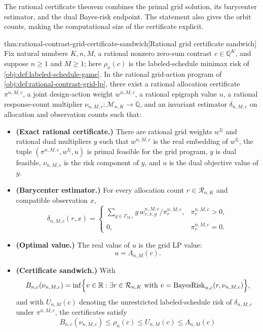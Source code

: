 \documentclass[11pt]{article}
\begin{document}
The rational certificate theorem combines the primal grid solution, its barycenter estimator, and the dual Bayes-risk endpoint. The statement also gives the orbit counts, making the computational size of the certificate explicit.

\begin{theoremv}{thm:rational-contrast-grid-certificate-sandwich}[Rational grid certificate sandwich]
Fix natural numbers \(K,n,M\), a rational nonzero zero-sum contrast \(c\in\mathbb Q^K\), and suppose \(n\geq 1\) and \(M\geq 1\); here \(\rho_n(c)\) is the labeled-schedule minimax risk of \cref{obj:def:labeled-schedule-game}.  In the rational grid-action program of \cref{obj:def:rational-contrast-grid-lp}, there exist a rational allocation certificate \(\pi^{n,M,c}\), a joint design-action weight \(w^{n,M,c}\), a rational epigraph value \(u\), a rational response-count multiplier \(\nu_{n,M,c}:\mathcal M_{n,K}\to\mathbb Q\), and an invariant estimator \(\delta_{n,M,c}\) on allocation and observation counts such that:
\begin{itemize}
\item \textbf{(Exact rational certificate.)}  There are rational grid weights \(w^{\mathbb Q}\) and rational dual multipliers \(y\) such that \(w^{n,M,c}\) is the real embedding of \(w^{\mathbb Q}\), the tuple \((\pi^{n,M,c},w^{\mathbb Q},u)\) is primal feasible for the grid program, \(y\) is dual feasible, \(\nu_{n,M,c}\) is the risk component of \(y\), and \(u\) is the dual objective value of \(y\).
\item \textbf{(Barycenter estimator.)}  For every allocation count \(r\in\mathcal R_{n,K}\) and compatible observation \(x\),
\[
\delta_{n,M,c}(r,x)
=
\begin{cases}
\displaystyle
\sum_{g\in\Gamma_{M,c}} g\,w_{r,x,g}^{n,M,c}/\pi_r^{n,M,c},
& \pi_r^{n,M,c}>0,\\[0.7em]
0,& \pi_r^{n,M,c}=0.
\end{cases}
\]
\item \textbf{(Optimal value.)}  The real value of \(u\) is the grid LP value:
\[
u=\Lambda_{n,M}(c).
\]
\item \textbf{(Certificate sandwich.)}  With
\[
B_{n,c}(\nu_{n,M,c})
=
\inf\Bigl\{v\in\mathbb R:\exists r\in\mathcal R_{n,K}\ \text{with}\ 
v=\operatorname{BayesRisk}_{n,c}(r,\nu_{n,M,c})\Bigr\},
\]
and with \(U_{n,M}(c)\) denoting the unrestricted labeled-schedule risk of \(\delta_{n,M,c}\) under \(\pi^{n,M,c}\), the certificates satisfy
\[
B_{n,c}(\nu_{n,M,c})
\leq
\rho_n(c)
\leq
U_{n,M}(c)
\leq
\Lambda_{n,M}(c)
\]
\end{itemize}
\end{theoremv}
\end{document}
